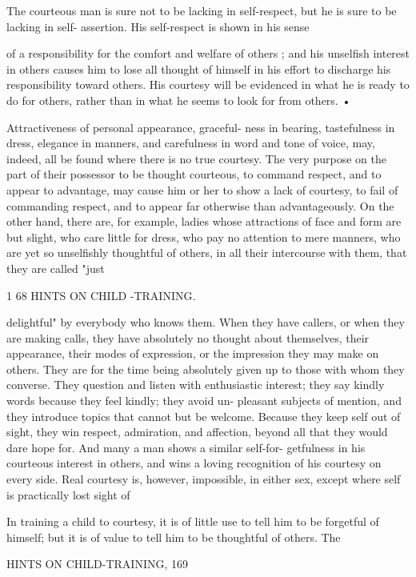 \documentclass[
]{book}
\begin{document}
The courteous man is sure not to be lacking in self-respect, but he is sure to be lacking in self- assertion. His self-respect is shown in his sense

of a responsibility for the comfort and welfare of others ; and his unselfish interest in others causes him to lose all thought of himself in his effort to discharge his responsibility toward others. His courtesy will be evidenced in what he is ready to do for others, rather than in what he seems to look for from others. •

Attractiveness of personal appearance, graceful- ness in bearing, tastefulness in dress, elegance in manners, and carefulness in word and tone of voice, may, indeed, all be found where there is no true courtesy. The very purpose on the part of their possessor to be thought courteous, to command respect, and to appear to advantage, may cause him or her to show a lack of courtesy, to fail of commanding respect, and to appear far otherwise than advantageously. On the other hand, there are, for example, ladies whose attractions of face and form are but slight, who care little for dress, who pay no attention to mere manners, who are yet so unselfishly thoughtful of others, in all their intercourse with them, that they are called "just

1 68 HINTS ON CHILD -TRAINING.

delightful" by everybody who knows them. When they have callers, or when they are making calls, they have absolutely no thought about themselves, their appearance, their modes of expression, or the impression they may make on others. They are for the time being absolutely given up to those with whom they converse. They question and listen with enthusiastic interest; they say kindly words because they feel kindly; they avoid un- pleasant subjects of mention, and they introduce topics that cannot but be welcome. Because they keep self out of sight, they win respect, admiration, and affection, beyond all that they would dare hope for. And many a man shows a similar self-for- getfulness in his courteous interest in others, and wins a loving recognition of his courtesy on every side. Real courtesy is, however, impossible, in either sex, except where self is practically lost sight of

In training a child to courtesy, it is of little use to tell him to be forgetful of himself; but it is of value to tell him to be thoughtful of others. The

HINTS ON CHILD-TRAINING, 169
\end{document}
